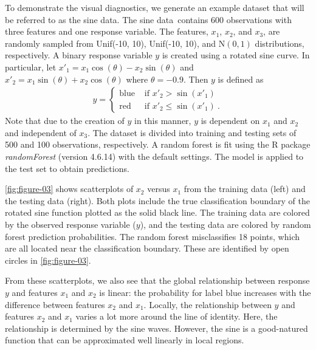 \documentclass[AMS,STIX2COL]{WileyNJD-v2}\usepackage[]{graphicx}\usepackage[]{color}
\newcommand{\data}{sine data}
\begin{document}
To demonstrate the visual diagnostics, we generate an example dataset that will be referred to as the \data. The \data \ contains 600 observations with three features and one response variable. The features, $x_1$, $x_2$, and $x_3$, are randomly sampled from Unif(-10, 10), Unif(-10, 10), and $\mbox{N}(0,1)$ distributions, respectively. A binary response variable $y$ is  created using a rotated sine curve. In particular, let $x'_1=x_1\cos(\theta)-x_2\sin(\theta)$ and $x'_2=x_1\sin(\theta)+x_2\cos(\theta)$ where $\theta=-0.9$. Then $y$ is defined as
\begin{eqnarray}\label{eq:data}
  y=\begin{cases}
  \mbox{blue} & \mbox{ if } x'_2 > \sin\left(x'_1\right) \\
  \mbox{red} & \mbox{ if } x'_2 \le \sin\left(x'_1\right) \ . %
  \end{cases}
\end{eqnarray}
Note that due to the creation of $y$ in this manner, $y$ is dependent on $x_1$ and $x_2$ and independent of $x_3$. The dataset is divided into training and testing sets of 500 and 100 observations, respectively.  A random forest  is fit using the R package \emph{randomForest} (version 4.6.14) \citep{liaw:2002} with the default settings. The model is applied to the test set to obtain predictions. 

\autoref{fig:figure-03} shows scatterplots of $x_2$ versus $x_1$ from the training data (left) and the testing data (right). Both plots include the true classification boundary of the rotated sine function plotted as the solid black line. The training data are colored by the observed response variable ($y$), and the testing data are colored by random forest  prediction probabilities. The random forest  misclassifies 18 points, which are all located near  the classification boundary. These are identified by open circles in \autoref{fig:figure-03}. 

From these scatterplots, we also see that the global relationship between response $y$ and features $x_1$ and $x_2$ is linear: the probability for label blue increases with the difference between features $x_2$ and $x_1$. Locally, the relationship between $y$ and features $x_2$ and $x_1$ varies a lot more around the line of identity. Here, the relationship is determined by the sine waves. However, the sine is a good-natured function that can be approximated well linearly in local regions.
\end{document}
